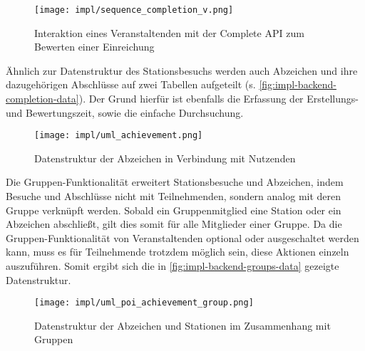 \begin{figure}[htpb]
    \centering
    \texttt{[image: impl/sequence\_completion\_v.png]}
    \caption{Interaktion eines Veranstaltenden mit der Complete API zum Bewerten einer Einreichung}
    \label{fig:impl-backend-complete-seq-v}
\end{figure}

Ähnlich zur Datenstruktur des Stationsbesuchs werden auch Abzeichen und ihre
dazugehörigen Abschlüsse auf zwei Tabellen aufgeteilt (s. \autoref{fig:impl-backend-completion-data}). Der Grund hierfür ist
ebenfalls die Erfassung der Erstellungs- und Bewertungszeit, sowie die einfache
Durchsuchung.

\begin{figure}[htpb]
    \centering
    \texttt{[image: impl/uml\_achievement.png]}
    \caption{Datenstruktur der Abzeichen in Verbindung mit Nutzenden}
    \label{fig:impl-backend-completion-data}
\end{figure}

\newpage

Die Gruppen-Funktionalität erweitert Stationsbesuche und Abzeichen, indem
Besuche und Abschlüsse nicht mit Teilnehmenden, sondern analog mit deren Gruppe
verknüpft werden. Sobald ein Gruppenmitglied eine Station oder ein Abzeichen
abschließt, gilt dies somit für alle Mitglieder einer Gruppe. Da die
Gruppen-Funktionalität von Veranstaltenden optional oder ausgeschaltet werden
kann, muss es für Teilnehmende trotzdem möglich sein, diese Aktionen einzeln
auszuführen. Somit ergibt sich die in \autoref{fig:impl-backend-groups-data}
gezeigte Datenstruktur.

\begin{figure}[htpb]
    \centering
    \texttt{[image: impl/uml\_poi\_achievement\_group.png]}
    \caption{Datenstruktur der Abzeichen und Stationen im Zusammenhang mit Gruppen}
    \label{fig:impl-backend-groups-data}
\end{figure}

